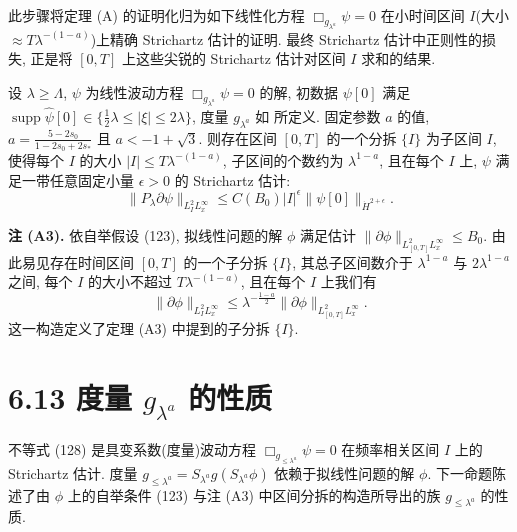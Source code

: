 此步骤将定理 (A) 的证明化归为如下线性化方程 $\Box_{g_{\lambda^a}}\psi=0$ 在小时间区间 $I$(大小 $\approx T\lambda^{-(1-a)}$)上精确 Strichartz 估计的证明. 最终 Strichartz 估计中正则性的损失, 正是将 $[0,T]$ 上这些尖锐的 Strichartz 估计对区间 $I$ 求和的结果.
\begin{theorem}[A3]\label{thm:6.12}
设 $\lambda\geq\Lambda$, $\psi$ 为线性波动方程 $\Box_{g_{\lambda^a}}\psi=0$ 的解, 初数据 $\psi[0]$ 满足 $\operatorname{supp}\hat\psi[0]\in\{\frac12\lambda\leq|\xi|\leq 2\lambda\}$, 度量 $g_{\lambda^a}$ 如 所定义. 固定参数 $a$ 的值, $a=\frac{5-2s_0}{1-2s_0+2s_*}$ 且 $a<-1+\sqrt3$. 则存在区间 $[0,T]$ 的一个分拆 $\{I\}$ 为子区间 $I$, 使得每个 $I$ 的大小 $|I|\leq T\lambda^{-(1-a)}$, 子区间的个数约为 $\lambda^{1-a}$, 且在每个 $I$ 上, $\psi$ 满足一带任意固定小量 $\epsilon>0$ 的 Strichartz 估计:
\begin{equation}
\|P_\lambda\partial\psi\|_{L_I^2L_x^\infty}\leq C(B_0)|I|^\epsilon\|\psi[0]\|_{\dot H^{2+\epsilon}}.\end{equation}
\end{theorem}

\textbf{注 (A3).} 依自举假设 (123), 拟线性问题的解 $\phi$ 满足估计 $\|\partial\phi\|_{L_{[0,T]}^2L_x^\infty}\leq B_0$. 由此易见存在时间区间 $[0,T]$ 的一个子分拆 $\{I\}$, 其总子区间数介于 $\lambda^{1-a}$ 与 $2\lambda^{1-a}$ 之间, 每个 $I$ 的大小不超过 $T\lambda^{-(1-a)}$, 且在每个 $I$ 上我们有
\begin{equation}
\|\partial\phi\|_{L_I^2L_x^\infty}\leq\lambda^{-\frac{1-a}{2}}\|\partial\phi\|_{L_{[0,T]}^2L_x^\infty}.\end{equation}
这一构造定义了定理 (A3) 中提到的子分拆 $\{I\}$.
\section*{6.13 度量 $g_{\lambda^a}$ 的性质}

不等式 (128) 是具变系数(度量)波动方程 $\Box_{g_{\leq\lambda^a}}\psi=0$ 在频率相关区间 $I$ 上的 Strichartz 估计.
度量 $g_{\leq\lambda^a}=S_{\lambda^a}g(S_{\lambda^a}\phi)$ 依赖于拟线性问题的解 $\phi$. 下一命题陈述了由 $\phi$ 上的自举条件 (123) 与注 (A3) 中区间分拆的构造所导出的族 $g_{\leq\lambda^a}$ 的性质.
\setcounter{mtthm}{13}%

